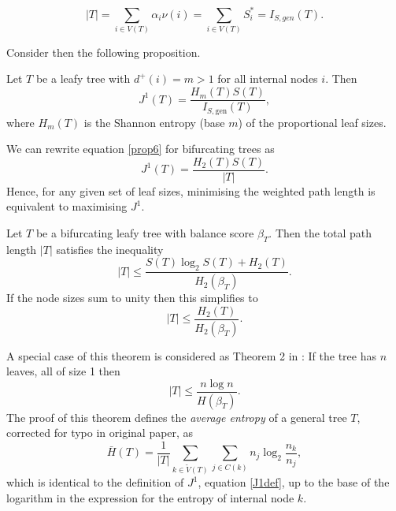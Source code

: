 \begin{equation}
    |T| = \sum_{i \in V(T)} \alpha_i \nu(i) = \sum_{i\in V(T)} S^*_i = I_{S, gen}(T).
\end{equation}

Consider then the following proposition.

\begin{proposition} \label{proposition6}
    Let $T$ be a leafy tree with $d^+(i) = m > 1$ for all internal nodes $i$. Then
    \begin{equation}
        J^1(T) = \frac{H_m(T)S(T)}{I_{S,\text{gen}}(T)}, \label{prop6}
    \end{equation}
    where $H_m(T)$ is the Shannon entropy (base $m$) of the proportional leaf sizes.
\end{proposition}

\begin{corollary}
    We can rewrite equation \eqref{prop6} for bifurcating trees as
    \begin{equation}
        J^1(T) = \frac{H_2(T)S(T)}{|T|}. \label{corr6}
    \end{equation}
    Hence, for any given set of leaf sizes, minimising the weighted path length
    is equivalent to maximising $J^1$.
\end{corollary}

\begin{theorem}\label{thm2}
    Let $T$ be a bifurcating leafy tree with balance score $\beta_T$. Then the
    total path length $|T|$ satisfies the inequality
    \begin{equation}
        |T| \leq \frac{S(T)\log_2S(T) + H_2(T)}{H_2(\beta_T)}.
    \end{equation}
    If the node sizes sum to unity then this simplifies to
    \begin{equation} \label{thm2eqn}
        |T| \leq \frac{H_2(T)}{H_2(\beta_T)}.
    \end{equation}
\end{theorem}

A special case of this theorem is considered as Theorem 2 in \citet{wong_upper_1973}:
If the tree has $n$ leaves, all of size 1 then
    \begin{equation}\label{thm2eqnspecial}
        |T| \leq \frac{n\log n}{H(\beta_T)}.
    \end{equation}
The proof of this theorem defines the \textit{average entropy} of a general tree
$T$, corrected for typo in original paper, as
\begin{equation}
    \bar{H}(T) = \frac{1}{|T|}\sum_{k\in\tilde{V}(T)}\sum_{j\in C(k)}n_j\log_2\frac{n_k}{n_j},
\end{equation}
which is identical to the definition of $J^1$, equation \eqref{J1def}, up to the
base of the logarithm in the expression for the entropy of internal node $k$.

